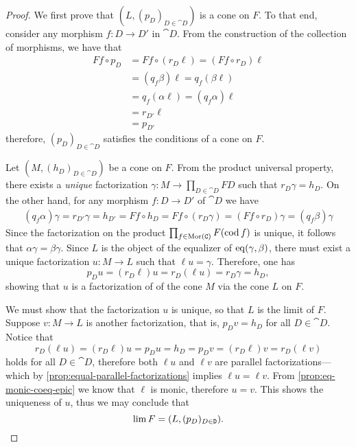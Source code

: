\begin{proof}
    We first prove that \((L, (p_D)_{D \in \cat D})\) is a cone on \(F\). To that
    end, consider any morphism \(f: D \to D'\) in \(\cat D\). From the construction
    of the collection of morphisms, we have that
    \begin{align*}
        F f \circ p_D
         & = F f \circ (r_D \ell)
        = (F f \circ r_D) \ell    \\
         & = (q_f \beta) \ell
        = q_f (\beta \ell)        \\
         & = q_f (\alpha \ell)
        = (q_f \alpha) \ell       \\
         & = r_{D'} \ell          \\
         & = p_{D'}
    \end{align*}
    therefore, \((p_D)_{D \in \cat D}\) satisfies the conditions of a cone on \(F\).

    Let \((M, (h_D)_{D \in \cat D})\) be a cone on \(F\). From the product universal
    property, there exists a \emph{unique} factorization
    \(\gamma: M \to \prod_{D \in \cat D} F D\) such that \(r_D \gamma = h_D\). On
    the other hand, for any morphism \(f: D \to D'\) of \(\cat D\) we have
    \begin{align*}
        (q_f \alpha) \gamma
        = r_{D'} \gamma
        = h_{D'}
        = F f \circ h_D
        = F f \circ (r_D \gamma)
        = (F f \circ r_D) \gamma
        = (q_f \beta) \gamma
    \end{align*}
    Since the factorization on the product \(\prod_{f \in \operatorname{Mor}(\texttt C)} F(\operatorname{cod}
    f)\) is unique, it follows that \(\alpha \gamma = \beta \gamma\). Since \(L\) is
    the object of the equalizer of \(\operatorname{eq}(\gamma, \beta)\), there must exist a unique
    factorization \(u: M \to L\) such that \(\ell u = \gamma\). Therefore, one has
    \[
        p_D u  = (r_D \ell) u = r_D (\ell u) = r_D \gamma = h_D,
    \]
    showing that \(u\) is a factorization of of the cone \(M\) via the cone \(L\) on
    \(F\).

    We must show that the factorization \(u\) is unique, so that \(L\) is the limit
    of \(F\). Suppose \(v: M \to L\) is another factorization, that is, \(p_D v =
    h_D\) for all \(D \in \cat D\). Notice that
    \[
        r_D (\ell u)
        = (r_D \ell) u
        = p_D u
        = h_D
        = p_D v
        = (r_D \ell) v
        = r_D (\ell v)
    \]
    holds for all \(D \in \cat D\), therefore both \(\ell u\) and \(\ell v\) are parallel
    factorizations---which by \cref{prop:equal-parallel-factorizations} implies
    \(\ell u = \ell v\).  From \cref{prop:eq-monic-coeq-epic} we know that \(\ell\) is monic,
    therefore \(u = v\). This shows the uniqueness of \(u\), thus we may conclude
    that
    \[
        \operatorname{lim} F = (L, (p_D)_{D \in \texttt D}).
    \]
\end{proof}

